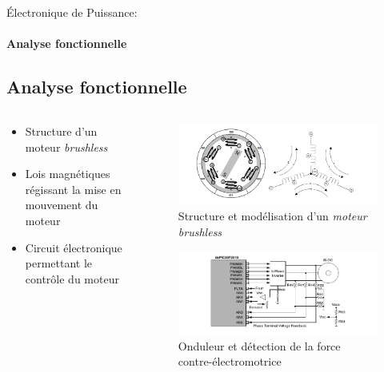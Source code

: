 \documentclass{beamer}
\begin{document}
	\begin{frame}{Électronique de Puissance:}
		\framesubtitle{Analyse fonctionnelle}
		\subsection[Analyse F]{Analyse fonctionnelle}
		\begin{columns}[T]
	  		\begin{column}{0.4\textwidth}
				\begin{itemize}
					\item Structure d'un moteur \textit{brushless}
					\item Lois magnétiques régissant la mise en mouvement du moteur
					\item Circuit électronique permettant le contrôle du moteur
				\end{itemize}
	  		\end{column}
	  		\begin{column}{0.6\textwidth}
	  			\vspace{-1em}
	  			\begin{figure}
	  				\begin{center}
	  					\includegraphics[height=0.3\textheight]{../Illus/struct_bldcm.png}
	  				\end{center}
	    			\caption{Structure et modélisation d'un \textit{moteur brushless}}
	    		\end{figure}
	    		\vspace{-2em}
	  			\begin{figure}
	  				\begin{center}
	  					\includegraphics[height=0.3\textheight]{../Illus/back_emf_scheme.png}
	  				\end{center}
	    			\caption{Onduleur et détection de la force contre-électromotrice}
	    		\end{figure}
	  		\end{column}
		\end{columns}

	\end{frame}	
		
\end{document}
